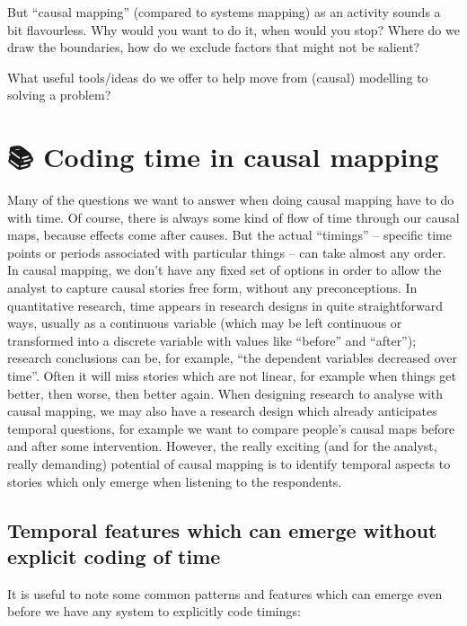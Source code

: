 \documentclass[
]{book}
\begin{document}
But ``causal mapping'' (compared to systems mapping) as an activity sounds a bit flavourless. Why would you want to do it, when would you stop? Where do we draw the boundaries, how do we exclude factors that might not be salient?

What useful tools/ideas do we offer to help move from (causal) modelling to solving a problem?

\hypertarget{coding-time-in-causal-mapping}{%
\chapter{📚 Coding time in causal mapping}\label{coding-time-in-causal-mapping}}

Many of the questions we want to answer when doing causal mapping have to do with time. Of course, there is always some kind of flow of time through our causal maps, because effects come after causes. But the actual ``timings'' -- specific time points or periods associated with particular things -- can take almost any order. In causal mapping, we don't have any fixed set of options in order to allow the analyst to capture causal stories free form, without any preconceptions. In quantitative research, time appears in research designs in quite straightforward ways, usually as a continuous variable (which may be left continuous or transformed into a discrete variable with values like ``before'' and ``after''); research conclusions can be, for example, ``the dependent variables decreased over time''. Often it will miss stories which are not linear, for example when things get better, then worse, then better again. When designing research to analyse with causal mapping, we may also have a research design which already anticipates temporal questions, for example we want to compare people's causal maps before and after some intervention. However, the really exciting (and for the analyst, really demanding) potential of causal mapping is to identify temporal aspects to stories which only emerge when listening to the respondents.

\hypertarget{temporal-features-which-can-emerge-without-explicit-coding-of-time}{%
\section{Temporal features which can emerge without explicit coding of time}\label{temporal-features-which-can-emerge-without-explicit-coding-of-time}}

It is useful to note some common patterns and features which can emerge even before we have any system to explicitly code timings:
\end{document}

